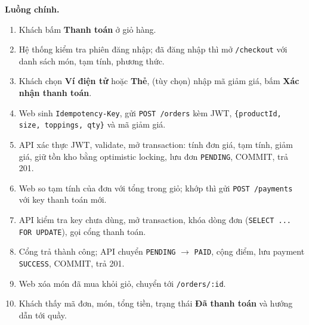 \documentclass[a4paper]{article}
\newcommand{\st}[1]{\texttt{#1}}
\newcommand{\ra}{\ensuremath{\rightarrow}}
\begin{document}
\textbf{Luồng chính.}
\begin{enumerate}
  \item Khách bấm \textbf{Thanh toán} ở giỏ hàng.
  \item Hệ thống kiểm tra phiên đăng nhập; đã đăng nhập thì mở \st{/checkout} với danh sách món, tạm tính, phương thức.
  \item Khách chọn \textbf{Ví điện tử} hoặc \textbf{Thẻ}, (tùy chọn) nhập mã giảm giá, bấm \textbf{Xác nhận thanh toán}.
  \item Web sinh \st{Idempotency-Key}, gửi \st{POST /orders} kèm JWT, \st{\{productId, size, toppings, qty\}} và mã giảm giá.
  \item API xác thực JWT, validate, mở transaction: tính đơn giá, tạm tính, giảm giá, giữ tồn kho bằng optimistic locking, lưu đơn \st{PENDING}, COMMIT, trả 201.
  \item Web so tạm tính của đơn với tổng trong giỏ; khớp thì gửi \st{POST /payments} với key thanh toán mới.
  \item API kiểm tra key chưa dùng, mở transaction, khóa dòng đơn (\st{SELECT ... FOR UPDATE}), gọi cổng thanh toán.
  \item Cổng trả thành công; API chuyển \st{PENDING} \ra{} \st{PAID}, cộng điểm, lưu payment \st{SUCCESS}, COMMIT, trả 201.
  \item Web xóa món đã mua khỏi giỏ, chuyển tới \st{/orders/:id}.
  \item Khách thấy mã đơn, món, tổng tiền, trạng thái \textbf{Đã thanh toán} và hướng dẫn tới quầy.
\end{enumerate}
\end{document}
